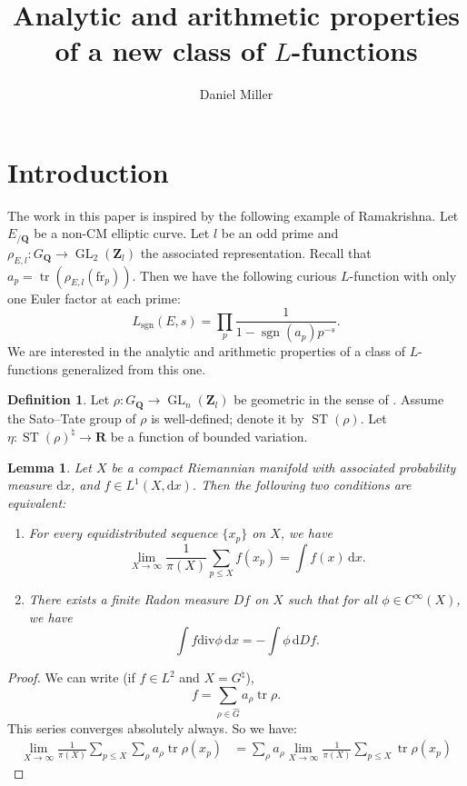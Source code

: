 \documentclass{article}
\title{Analytic and arithmetic properties of a new class of \texorpdfstring{$L$}{L}-functions}
\author{Daniel Miller}
\DeclareMathOperator{\GL}{GL}
\DeclareMathOperator{\sgn}{sgn}
\DeclareMathOperator{\ST}{ST}
\DeclareMathOperator{\tr}{tr}
\newcommand{\bQ}{\mathbf{Q}}
\newcommand{\bR}{\mathbf{R}}
\newcommand{\bZ}{\mathbf{Z}}
\newcommand{\dd}{\mathrm{d}}
\newcommand{\ddiv}{\mathrm{div}}
\newcommand{\fr}{\mathrm{fr}}
\newtheorem{lemma}[theorem]{Lemma}
\theoremstyle{definition}
\newtheorem{definition}[theorem]{Definition}
\numberwithin{theorem}{section}
\begin{document}
\maketitle





\section{Introduction}

The work in this paper is inspired by the following example of Ramakrishna. Let 
$E_{/\bQ}$ be a non-CM elliptic curve. Let $l$ be an odd prime and 
$\rho_{E,l}\colon G_\bQ \to \GL_2(\bZ_l)$ the associated representation. Recall 
that $a_p = \tr(\rho_{E,l}(\fr_p))$. Then we have the following curious 
$L$-function with only one Euler factor at each prime: 
\[
	L_{\sgn}(E,s) = \prod_p \frac{1}{1-\sgn(a_p) p^{-s}} .
\]
We are interested in the analytic and arithmetic properties of a class of 
$L$-functions generalized from this one. 

\begin{definition}
Let $\rho\colon G_\bQ \to \GL_n(\bZ_l)$ be geometric in the sense of 
\cite{fontain-mazur-1995}. Assume the Sato--Tate group of $\rho$ is 
well-defined; denote it by $\ST(\rho)$. Let 
$\eta\colon \ST(\rho)^\natural \to \bR$ be a function of bounded variation.  
\end{definition}





\begin{lemma}
Let $X$ be a compact Riemannian manifold with associated probability measure 
$\dd x$, and $f\in L^1(X, \dd x)$. Then the following two conditions are 
equivalent:
\begin{enumerate}
\item
For every equidistributed sequence $\{x_p\}$ on $X$, we have 
\[
	\lim_{X\to \infty} \frac{1}{\pi(X)} \sum_{p\leqslant X} f(x_p) = \int f(x)\, \dd x .
\]
\item
There exists a finite Radon measure $D f$ on $X$ such that for all 
$\phi\in C^\infty(X)$, we have 
\[
	\int f\ddiv \phi\, \dd x = -\int \phi\, \dd Df .
\]
\end{enumerate}
\end{lemma}
\begin{proof}
We can write (if $f\in L^2$ and $X=G^\natural$), 
\[
	f = \sum_{\rho\in \widehat G} a_\rho \tr \rho .
\]
This series converges absolutely always. So we have:
\begin{align*}
	\lim_{X\to \infty} \frac{1}{\pi(X)} \sum_{p\leqslant X} \sum_\rho a_\rho \tr \rho(x_p)
		&= \sum_\rho a_\rho \lim_{X\to \infty} \frac{1}{\pi(X)}\sum_{p\leqslant X} \tr \rho(x_p)
\end{align*}
\end{proof}





\printbibliography
\end{document}
